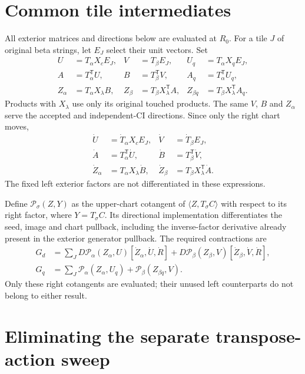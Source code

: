 \documentclass[11pt,a4paper]{article}
\newcommand{\T}{^{\mathsf T}}
\begin{document}
\section{Common tile intermediates}

All exterior matrices and directions below are evaluated at $R_0$. For a
tile $J$ of original beta strings, let $E_J$ select their unit vectors. Set
\begin{align}
 U&=T_\alpha X_cE_J,& V&=T_\beta E_J,& U_q&=T_\alpha X_qE_J,\\
 A&=T_\alpha\T U,& B&=T_\beta\T V,& A_q&=T_\alpha\T U_q,\\
 Z_\alpha&=T_\alpha X_\lambda B,&
 Z_\beta&=T_\beta X_\lambda\T A,&
 Z_{\beta q}&=T_\beta X_\lambda\T A_q.
\end{align}
Products with $X_\lambda$ use only its original touched products. The same
$V$, $B$ and $Z_\alpha$ serve the accepted and independent-CI directions.
Since only the right chart moves,
\begin{align}
 \dot U&=\dot T_\alpha X_cE_J,& \dot V&=\dot T_\beta E_J,\\
 \dot A&=T_\alpha\T\dot U,& \dot B&=T_\beta\T\dot V,\\
 \dot Z_\alpha&=T_\alpha X_\lambda\dot B,&
 \dot Z_\beta&=T_\beta X_\lambda\T\dot A.
\end{align}
The fixed left exterior factors are not differentiated in these expressions.

Define $\mathcal P_\sigma(Z,Y)$ as the upper-chart cotangent of
$\langle Z,T_\sigma C\rangle$ with respect to its right factor, where
$Y=T_\sigma C$. Its directional implementation differentiates the seed,
image and chart pullback, including the inverse-factor derivative already
present in the exterior generator pullback. The required contractions are
\begin{align}
 G_d&=\sum_J D\mathcal P_\alpha(Z_\alpha,U)
       [\dot Z_\alpha,\dot U,\dot R]
       +D\mathcal P_\beta(Z_\beta,V)[\dot Z_\beta,\dot V,\dot R],\\
 G_q&=\sum_J\mathcal P_\alpha(Z_\alpha,U_q)
                 +\mathcal P_\beta(Z_{\beta q},V).
\end{align}
Only these right cotangents are evaluated; their unused left counterparts
do not belong to either result.

\section{Eliminating the separate transpose-action sweep}
\end{document}
